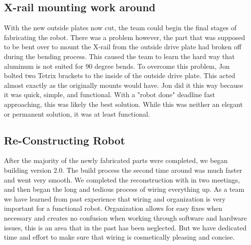 \documentclass{article}
\begin{document}
\subsection{X-rail mounting work around}
With the new outside plates now cut, the team could begin the final stages of fabricating the robot. There was a problem however, the part that was supposed to be bent over to mount the X-rail from the outside drive plate had broken off during the bending process. This caused the team to learn the hard way that aluminum is not suited for 90 degree bends. To overcome this problem, Jon bolted two Tetrix brackets to the inside of the outside drive plate. This acted almost exactly as the originally mounts would have. Jon did it this way because it was quick, simple, and functional. With a "robot done" deadline fast approaching, this was likely the best solution. While this was neither an elegant or permanent solution, it was at least functional.

\subsection{Re-Constructing Robot}
After the majority of the newly fabricated parts were completed, we began building version 2.0. The build process the second time around was much faster and went very smooth. We completed the reconstruction with in two meetings, and then began the long and tedious process of wiring everything up. As a team we have learned from past experience that wiring and organization is very important for a functional robot. Organization allows for easy fixes when necessary and creates no confusion when working through software and hardware issues, this is an area that in the past has been neglected. But we have dedicated time and effort to make sure that wiring is cosmetically pleasing and concise. 
\end{document}
